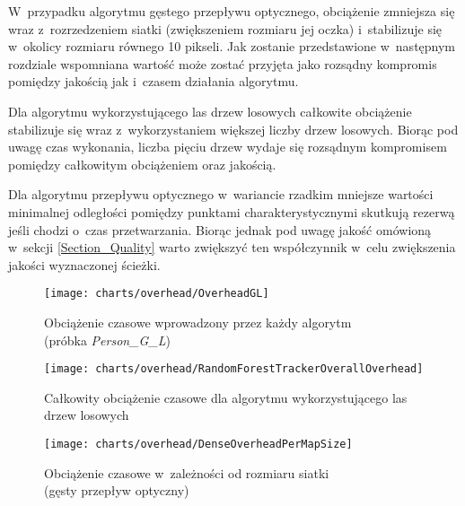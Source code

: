     W~przypadku algorytmu gęstego przepływu optycznego, obciążenie zmniejsza się wraz z~rozrzedzeniem siatki (zwiększeniem rozmiaru jej oczka) i~stabilizuje się w~okolicy rozmiaru równego 10 pikseli. Jak zostanie przedstawione w~następnym rozdziale wspomniana wartość może zostać przyjęta jako rozsądny kompromis pomiędzy jakością jak i~czasem działania algorytmu.

    Dla algorytmu wykorzystującego las drzew losowych całkowite obciążenie stabilizuje się wraz z~wykorzystaniem większej liczby drzew losowych. Biorąc pod uwagę czas wykonania, liczba pięciu drzew wydaje się rozsądnym kompromisem pomiędzy całkowitym obciążeniem oraz jakością.

    Dla algorytmu przepływu optycznego w~wariancie rzadkim mniejsze wartości minimalnej odległości pomiędzy punktami charakterystycznymi skutkują rezerwą jeśli chodzi o~czas przetwarzania. Biorąc jednak pod uwagę jakość omówioną w~sekcji \ref{Section_Quality} warto zwiększyć ten współczynnik w~celu zwiększenia jakości wyznaczonej ścieżki.

    \newpage
      \begin{figure}[!ht]
        \centering
        \texttt{[image: charts/overhead/OverheadGL]}
        \caption[Obciążenie czasowe wprowadzony przez każdy algorytm]
                {Obciążenie czasowe wprowadzony przez każdy algorytm\\(próbka \textit{Person\_G\_L})}
        \label{fig:OverheadGL}
      \end{figure}

      \begin{figure}[!ht]
        \centering
        \texttt{[image: charts/overhead/RandomForestTrackerOverallOverhead]}
        \caption[Całkowity obciążenie czasowe dla algorytmu wykorzystującego las drzew losowych]
                {Całkowity obciążenie czasowe dla algorytmu wykorzystującego las drzew losowych}
        \label{fig:RandomForestTrackerOverhead}
      \end{figure}

    \newpage
      \begin{figure}[!ht]
        \centering
        \texttt{[image: charts/overhead/DenseOverheadPerMapSize]}
        \caption[Obciążenie czasowe w~zależności od rozmiaru siatki]
                {Obciążenie czasowe w~zależności od rozmiaru siatki\\(gęsty przepływ optyczny)}
        \label{fig:SpecialisedDenseOverhead}
      \end{figure}

